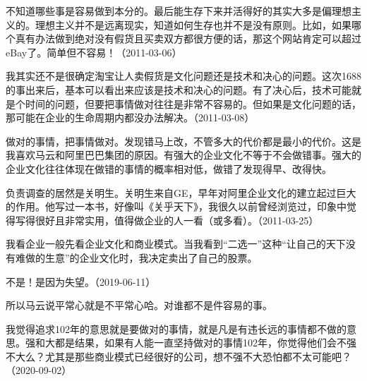 不知道哪些事是容易做到本分的。最后能生存下来并活得好的其实大多是偏理想主义的。理想主义并不是远离现实，知道如何生存也并不是没有原则。比如，如果哪个真有办法做到绝对没有假货且买卖双方都很方便的话，那这个网站肯定可以超过eBay了。简单但不容易！（2011-03-06）


我其实还不是很确定淘宝让人卖假货是文化问题还是技术和决心的问题。这次1688的事出来后，基本可以看出来应该是技术和决心的问题。有了决心后，技术可能就是个时间的问题，但要把事情做对往往是非常不容易的。但如果是文化问题的话，那可能在企业的生命周期内都没办法解决。（2011-03-08）


做对的事情，把事情做对。发现错马上改，不管多大的代价都是最小的代价。这是我喜欢马云和阿里巴巴集团的原因。有强大的企业文化不等于不会做错事。强大的企业文化往往体现在做错的事情的概率相对低，做错了发现得早、改得快。

负责调查的居然是关明生。关明生来自GE，早年对阿里企业文化的建立起过巨大的作用。他写过一本书，好像叫《关乎天下》，我很久以前曾经浏览过，印象中觉得写得很好且非常实用，值得做企业的人一看（或多看）。（2011-03-25）



我看企业一般先看企业文化和商业模式。当我看到“二选一”这种“让自己的天下没有难做的生意”的企业文化时，我决定卖出了自己的股票。


不是！是因为失望。（2019-06-11）


所以马云说平常心就是不平常心哈。对谁都不是件容易的事。


我觉得追求102年的意思就是要做对的事情，就是凡是有违长远的事情都不做的意思。强和大都是结果，如果有人能一直坚持做对的事情102年，你觉得他们会不强不大么？尤其是那些商业模式已经很好的公司，想不强不大恐怕都不太可能吧？（2020-09-02）


